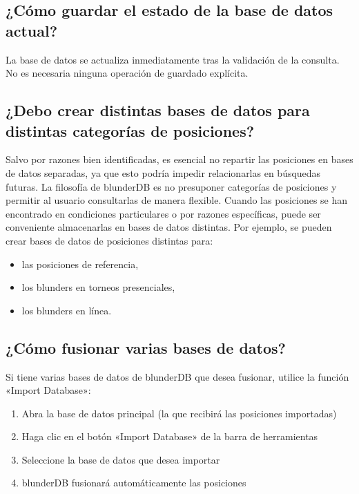 \documentclass[letterpaper,10pt,spanish]{sphinxmanual}
\begin{document}
\subsection{¿Cómo guardar el estado de la base de datos actual?}
\label{\detokenize{faq:comment-sauvegarder-la-base-de-donnees-courante}}
\sphinxAtStartPar
La base de datos se actualiza inmediatamente tras la validación de la consulta. No es necesaria ninguna operación de guardado explícita.


\subsection{¿Debo crear distintas bases de datos para distintas categorías de posiciones?}
\label{\detokenize{faq:dois-je-creer-differentes-bases-de-donnees-pour-differentes-categories-de-positions}}
\sphinxAtStartPar
Salvo por razones bien identificadas, es esencial no repartir las posiciones en bases de datos separadas, ya que esto podría impedir relacionarlas en búsquedas futuras. La filosofía de blunderDB es no presuponer categorías de posiciones  y permitir al usuario consultarlas de manera flexible. Cuando las posiciones se han encontrado en condiciones particulares o por razones específicas, puede ser conveniente almacenarlas en bases de datos distintas. Por ejemplo, se pueden crear bases de datos de posiciones distintas para:
\begin{itemize}
\item {} 
\sphinxAtStartPar
las posiciones de referencia,

\item {} 
\sphinxAtStartPar
los blunders en torneos presenciales,

\item {} 
\sphinxAtStartPar
los blunders en línea.

\end{itemize}


\subsection{¿Cómo fusionar varias bases de datos?}
\label{\detokenize{faq:comment-fusionner-plusieurs-bases-de-donnees}}
\sphinxAtStartPar
Si tiene varias bases de datos de blunderDB que desea fusionar, utilice la función «Import Database»:
\begin{enumerate}
%
\item {} 
\sphinxAtStartPar
Abra la base de datos principal (la que recibirá las posiciones importadas)

\item {} 
\sphinxAtStartPar
Haga clic en el botón «Import Database» de la barra de herramientas

\item {} 
\sphinxAtStartPar
Seleccione la base de datos que desea importar

\item {} 
\sphinxAtStartPar
blunderDB fusionará automáticamente las posiciones

\end{enumerate}
\end{document}
